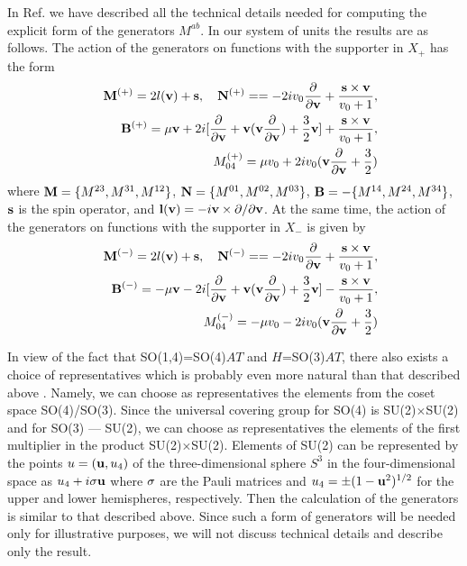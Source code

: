 \documentclass[a4paper,12pt]{article}%
\begin{document}
\begin{sloppypar}
In Ref. \cite{hep} we have described all the technical details
needed for computing the explicit form of the generators $M^{ab}$.
In our system of units the results are as follows.
The action  of the generators on functions with the supporter in
$X_+$ has the form
\begin{eqnarray}
&&{\bf M}^{(+)}=2l({\bf v})+{\bf s},\quad {\bf N}^{(+)}==-2i v_0
\frac{\partial}{\partial {\bf v}}+\frac{{\bf s}\times {\bf v}}
{v_0+1}, \nonumber\\
&& {\bf B}^{(+)}=\mu {\bf v}+2i [\frac{\partial}{\partial {\bf v}}+
{\bf v}({\bf v}\frac{\partial}{\partial {\bf v}})+\frac{3}{2}{\bf v}]+
\frac{{\bf s}\times {\bf v}}{v_0+1},\nonumber\\
&& M_{04}^{(+)}=\mu v_0+2i v_0({\bf v}
\frac{\partial}{\partial {\bf v}}+\frac{3}{2})
\label{9}
\end{eqnarray}
where ${\bf M}=\{M^{23},M^{31},M^{12}\}$,
${\bf N}=\{M^{01},M^{02},M^{03}\}$,
${\bf B}=-\{M^{14},M^{24},M^{34}\}$, ${\bf s}$ is the spin operator,
and ${\bf l}({\bf v})=-i{\bf v}
\times \partial/\partial {\bf v}$.
At the same time, the action of the generators on 
functions with the supporter 
in $X_-$ is given by
\begin{eqnarray}
&&{\bf M}^{(-)}=2l({\bf v})+{\bf s},\quad {\bf N}^{(-)}==-2i v_0
\frac{\partial}{\partial {\bf v}}+\frac{{\bf s}\times {\bf v}}
{v_0+1}, \nonumber\\
&& {\bf B}^{(-)}=-\mu {\bf v}-2i [\frac{\partial}{\partial {\bf v}}+
{\bf v}({\bf v}\frac{\partial}{\partial {\bf v}})+\frac{3}{2}{\bf v}]-
\frac{{\bf s}\times {\bf v}}{v_0+1},\nonumber\\
&& M_{04}^{(-)}=-\mu v_0-2i v_0({\bf v}
\frac{\partial}{\partial {\bf v}}+\frac{3}{2})
\label{10}
\end{eqnarray}
\end{sloppypar}

In view of the fact that SO(1,4)=SO(4)$AT$ and $H$=SO(3)$AT$, there
also exists a choice of representatives which is probably even
more natural than that described above \cite{Men,Dobrev,Moy}. 
Namely, we can choose as
representatives the elements from the coset space SO(4)/SO(3).
Since the universal covering group for SO(4) is SU(2)$\times$SU(2)
and for SO(3) --- SU(2), we can choose as representatives the
elements of the first multiplier in the product SU(2)$\times$SU(2). 
Elements of SU(2) can be represented by the points $u=({\bf u},u_4)$
of the three-dimensional sphere $S^3$ in the four-dimensional
space as $u_4+i{\bf \sigma u}$ where ${\bf \sigma}$ are the Pauli
matrices and $u_4=\pm (1-{\bf u}^2)^{1/2}$ for the upper and
lower hemispheres, respectively. Then the calculation of the
generators is similar to that described above. Since such a form
of generators will be needed only for illustrative purposes, we
will not discuss technical details and describe only the 
result.
\end{document}
